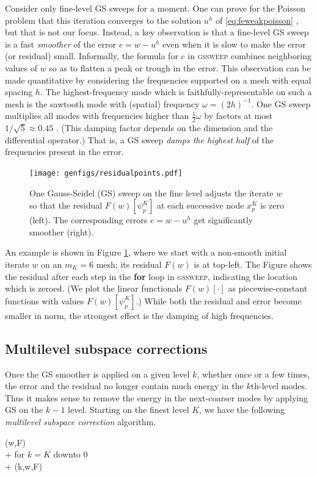 \documentclass[letterpaper,final,12pt,reqno]{amsart}
\theoremstyle{claim}
\numberwithin{equation}{section}
\numberwithin{figure}{section}
\numberwithin{table}{section}
\begin{document}
Consider only fine-level GS sweeps for a moment.  One can prove for the Poisson problem that this iteration converges to the solution $u^h$ of \eqref{eq:feweakpoisson} \cite[for example]{Greenbaum1997}, but that is not our focus.  Instead, a key observation is that a fine-level GS sweep is a fast \emph{smoother} of the error $e=w-u^h$ even when it is slow to make the error (or residual) small.  Informally, the formula for $c$ in \textsc{gssweep} combines neighboring values of $w$ so as to flatten a peak or trough in the error.  This observation can be made quantitative by considering the frequencies supported on a mesh with equal spacing $h$.  The highest-frequency mode which is faithfully-representable on such a mesh is the sawtooth mode with (spatial) frequency $\omega=(2h)^{-1}$.  One GS sweep multiplies all modes with frequencies higher than $\frac{1}{2} \omega$ by factors at most $1/\sqrt{5}\approx 0.45$ \cite[Chapter 4]{Briggsetal2000}.  (This damping factor depends on the dimension and the differential operator.)  That is, a GS sweep \emph{damps the highest half} of the frequencies present in the error.

\begin{figure}[t]
\texttt{[image: genfigs/residualpoints.pdf]}
\caption{One Gauss-Seidel (GS) sweep on the fine level adjusts the iterate $w$ so that the residual $F(w)[\psi_p^K]$ at each successive node $x_p^K$ is zero (left).  The corresponding errors $e=w-u^h$ get significantly smoother (right).}
\label{fig:residualpoints}
\end{figure}

An example is shown in Figure \ref{fig:residualpoints}, where we start with a non-smooth initial iterate $w$ on an $m_K=6$ mesh; its residual $F(w)$ is at top-left.  The Figure shows the residual after each step in the \textbf{for} loop in \textsc{gssweep}, indicating the location which is zeroed.  (We plot the linear functionals $F(w)[\cdot]$ as piecewise-constant functions with values $F(w)[\psi_p^K]$.)  While both the residual and error become smaller in norm, the strongest effect is the damping of high frequencies.

\subsection*{Multilevel subspace corrections}  Once the GS smoother is applied on a given level $k$, whether once or a few times, the error and the residual no longer contain much energy in the $k$th-level modes.  Thus it makes sense to remove the energy in the next-coarser modes by applying GS on the $k-1$ level.  Starting on the finest level $K$, we have the following \emph{multilevel subspace correction} algorithm.
\begin{pseudo*}
(w,F)\text{:} \\+
    for $k=K$ downto $0$ \\+
        (k,w,F)
\end{pseudo*}
\end{document}
